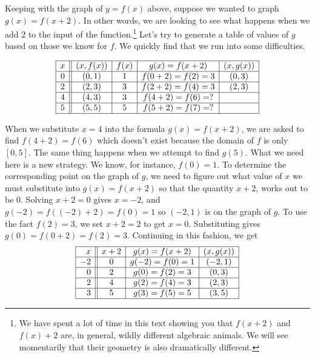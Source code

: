 \smallskip

Keeping with the graph of $y=f(x)$ above, suppose we wanted to graph $g(x) = f(x+2)$.  In other words, we are looking to see what happens when we add $2$ to the input of the function.\footnote{We have spent a lot of time in this text showing you that $f(x+2)$ and $f(x)+2$ are, in general, wildly different algebraic animals.   We will see momentarily that their geometry is also dramatically different.}  Let's try to generate a table of values of $g$ based on those we know for $f$.  We quickly find that we run into some difficulties.

\[ \begin{array}{|c||c|c|c|c|}  

\hline

x & (x,f(x)) & f(x)& g(x)=f(x+2) & (x, g(x)) \\ \hline
0  & (0,1)& 1 & f(0+2) = f(2) = 3   &(0, 3) \\  \hline
2 & (2,3) & 3 & f(2+2) = f(4) = 3  &(2,3) \\  \hline
4 & (4,3) & 3 &  f(4+2) = f(6) = ? &  \\  \hline
5 & (5,5) & 5 & f(5+2) = f(7) = ?  &  \\  \hline

\end{array} \] 

When we substitute $x=4$ into the formula $g(x)=f(x+2)$, we are asked to find $f(4+2)=f(6)$ which doesn't exist because the domain of $f$ is only $[0,5]$.  The same thing happens when we attempt to find $g(5)$.  What we need here is a new strategy.  We know, for instance, $f(0) = 1$.  To determine the corresponding point on the graph of $g$, we need to figure out what value of $x$ we must substitute into $g(x) = f(x+2)$ so that the quantity $x+2$, works out to be $0$.  Solving $x+2=0$ gives $x=-2$, and $g(-2) = f((-2)+2) = f(0) = 1$ so  $(-2,1)$ is on the graph of $g$.  To use the fact $f(2) = 3$, we set $x+2 = 2$ to get $x=0$. Substituting gives $g(0) = f(0+2) = f(2) = 3$.  Continuing in this fashion, we get  \[ \begin{array}{|r||c|c|c|}  

\hline

x & x+2 & g(x)=f(x+2) & (x, g(x)) \\ \hline
-2 & 0 & g(-2)=f(0) = 1   &(-2, 1) \\  \hline
0 &  2 &  g(0)=f(2) = 3  &(0,3) \\  \hline
2 & 4  & g(2)=f(4) = 3 &  (2,3)\\  \hline
3 & 5 & g(3)=f(5) = 5  & (3,5) \\  \hline

\end{array} \] 

